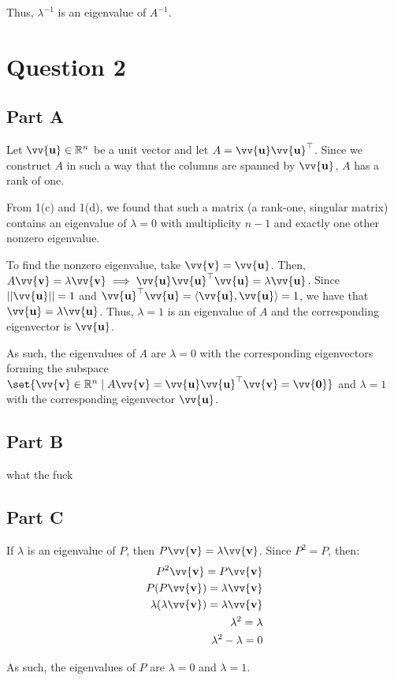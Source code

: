 \documentclass[12pt]{article}
\newcommand{\vect}[1]{\vv{\mathbf{#1}}}
\newcommand{\R}{\mathbb{R}}
\begin{document}
Thus, $\lambda^{-1}$ is an eigenvalue of $A^{-1}$.

\section*{Question 2}

\subsection*{Part A}

Let $\vect{u}\in\R^n$ be a unit vector and let $A=\vect{u}\vect{u}^\top$. Since we construct $A$ in such a way that the columns are spanned by $\vect{u}$, $A$ has a rank of one.

From 1(c) and 1(d), we found that such a matrix (a rank-one, singular matrix) contains an eigenvalue of $\lambda=0$ with multiplicity $n-1$ and exactly one other nonzero eigenvalue.

To find the nonzero eigenvalue, take $\vect{v}=\vect{u}$. Then, $A\vect{v} = \lambda\vect{v} \implies \vect{u}\vect{u}^\top\vect{u} = \lambda\vect{u}$. Since $||\vect{u}||=1$ and $\vect{u}^\top\vect{u}=\langle\vect{u},\vect{u}\rangle=1$, we have that $\vect{u}=\lambda\vect{u}$. Thus, $\lambda=1$ is an eigenvalue of $A$ and the corresponding eigenvector is $\vect{u}$.

As such, the eigenvalues of $A$ are $\lambda=0$ with the corresponding eigenvectors forming the subspace $\set{\vect{v}\in\R^n\mid A\vect{v}=\vect{u}\vect{u}^\top\vect{v}=\vect{0}}$ and $\lambda=1$ with the corresponding eigenvector $\vect{u}$.

\subsection*{Part B}

what the fuck

\subsection*{Part C}

If $\lambda$ is an eigenvalue of $P$, then $P\vect{v}=\lambda\vect{v}$. Since $P^2=P$, then:
\begin{align*}
    P^2\vect{v} = P\vect{v} \\
    P(P\vect{v}) = \lambda\vect{v} \\
    \lambda(\lambda\vect{v}) = \lambda\vect{v} \\
    \lambda^2 = \lambda \\
    \lambda^2-\lambda = 0
\end{align*}

As such, the eigenvalues of $P$ are $\lambda=0$ and $\lambda=1$.
\end{document}
